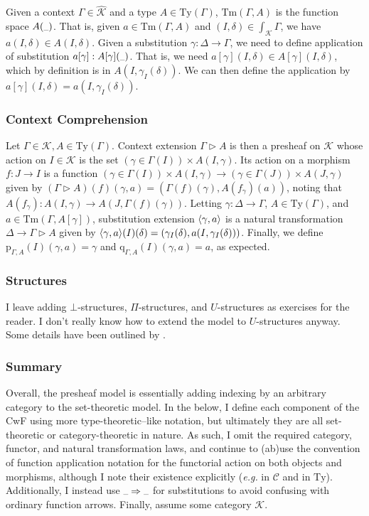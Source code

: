 \documentclass{article}
\makeatletter
\newcommand{\eg}{\textit{e.g.}\@\xspace}
\renewcommand{\_}{\textrm{\textscale{.5}{\textunderscore}}}
\DeclarePairedDelimiter{\ctxt}{\langle}{\rangle}
\newcommand{\Tm}{\mathrm{Tm}}
\newcommand{\Ty}{\mathrm{Ty}}
\newcommand{\p}{\mathrm{p}}
\newcommand{\q}{\mathrm{q}}
\newcommand{\To}{\Rightarrow}
\newcommand{\sPair}[3]{(#1 \mathbin{\in} #2) \mathrel{\times} #3}
\theoremstyle{definition}
\theoremstyle{plain}
\makeatother
\begin{document}
Given a context $\Gamma \in \widehat{\mathcal{K}}$ and a type $A \in \Ty(\Gamma)$,
$\Tm(\Gamma, A)$ is the function space $A(\_)$.
That is, given $a \in \Tm(\Gamma, A)$ and $(I, \delta) \in \int_{\mathcal{K}} \Gamma$,
we have $a(I, \delta) \in A(I, \delta)$.
Given a substitution $\gamma : \Delta \to \Gamma$, we need to define application of substitution $a[\gamma] : A[\gamma](\_)$.
That is, we need $a[\gamma](I, \delta) \in A[\gamma](I, \delta)$, which by definition is in $A(I, \gamma_I(\delta))$.
We can then define the application by $a[\gamma](I, \delta) = a(I, \gamma_I(\delta))$.

\subsubsection{Context Comprehension}

Let $\Gamma \in \mathcal{K}, A \in \Ty(\Gamma)$.
Context extension $\Gamma \rhd A$ is then a presheaf on $\mathcal{K}$
whose action on $I \in \mathcal{K}$ is the set $\sPair{\gamma}{\Gamma(I)}{A(I, \gamma)}$.
Its action on a morphism $f : J \to I$ is a function $\sPair{\gamma}{\Gamma(I)}{A(I, \gamma)} \to \sPair{\gamma}{\Gamma(J)}{A(J, \gamma)}$
given by $(\Gamma \rhd A)(f)(\gamma, a) = (\Gamma(f)(\gamma), A(f_\gamma)(a))$,
noting that $A(f_\gamma) : A(I, \gamma) \to A(J, \Gamma(f)(\gamma))$.
Letting $\gamma : \Delta \to \Gamma$, $A \in \Ty(\Gamma)$, and $a \in \Tm(\Gamma, A[\gamma])$,
substitution extension $\ctxt{\gamma, a}$ is a natural transformation $\Delta \to \Gamma \rhd A$
given by $\ctxt{\gamma, a}(I)(\delta) = (\gamma_I(\delta), a(I, \gamma_I(\delta)))$.
Finally, we define $\p_{\Gamma, A}(I)(\gamma, a) = \gamma$ and $\q_{\Gamma, A}(I)(\gamma, a) = a$, as expected.

\subsubsection{Structures}

I leave adding $\bot$-structures, $\Pi$-structures, and $U$-structures
as exercises for the reader.
I don't really know how to extend the model to $U$-structures anyway.
Some details have been outlined by \citet{presheaf}.

\subsubsection{Summary}

Overall, the presheaf model is essentially adding indexing by an arbitrary category to the set-theoretic model.
In the below, I define each component of the CwF using more type-theoretic--like notation,
but ultimately they are all set-theoretic or category-theoretic in nature.
As such, I omit the required category, functor, and natural transformation laws,
and continue to (ab)use the convention of function application notation for the functorial action on both objects and morphisms,
although I note their existence explicitly (\eg in $\mathcal{C}$ and in $\Ty$).
Additionally, I instead use $\_\To\_$ for substitutions to avoid confusing with ordinary function arrows.
Finally, assume some category $\mathcal{K}$.
\end{document}
